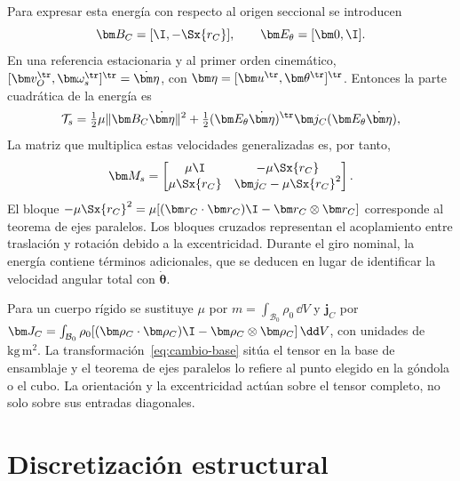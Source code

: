 

Para expresar esta energía con respecto al origen seccional se introducen
\begin{equation}
\bm B_C=[\I,-\Sx{r_C}],\qquad \bm E_\theta=[\bm0,\I].
\end{equation}
En una referencia estacionaria y al primer orden cinemático,
$[\bm v_O^\tr,\bm\omega_s^\tr]^\tr=\dot{\bm\eta}$,
con $\bm\eta=[\bm u^\tr,\bm\theta^\tr]^\tr$. Entonces la parte cuadrática de la energía es
\begin{equation}
\mathcal T_s=\tfrac12\mu\|\bm B_C\dot{\bm\eta}\|^2
+\tfrac12(\bm E_\theta\dot{\bm\eta})^\tr\bm j_C(\bm E_\theta\dot{\bm\eta}),
\end{equation}
La matriz que multiplica estas velocidades generalizadas es, por tanto,
\begin{equation}
\bm M_s=\begin{bmatrix}
\mu\I&-\mu\Sx{r_C}\\
\mu\Sx{r_C}&\bm j_C-\mu\Sx{r_C}^2
\end{bmatrix}.
\label{eq:Ms}
\end{equation}
El bloque $-\mu\Sx{r_C}^2=\mu[(\bm r_C\cdot\bm r_C)\I-\bm r_C\otimes\bm r_C]$ corresponde al teorema de ejes paralelos. Los bloques cruzados representan el acoplamiento entre traslación y rotación debido a la excentricidad. Durante el giro nominal, la energía contiene términos adicionales, que se deducen en lugar de identificar la velocidad angular total con $\dot{\bm\theta}$.

Para un cuerpo rígido se sustituye $\mu$ por $m=\int_{\mathcal B_0}\rho_0\,\dd V$ y $\bm j_C$ por $\bm J_C=\int_{\mathcal B_0}\rho_0[(\bm\rho_C\cdot\bm\rho_C)\I-\bm\rho_C\otimes\bm\rho_C]\,\dd V$, con unidades de $\mathrm{kg\,m^2}$. La transformación~\eqref{eq:cambio-base} sitúa el tensor en la base de ensamblaje y el teorema de ejes paralelos lo refiere al punto elegido en la góndola o el cubo. La orientación y la excentricidad actúan sobre el tensor completo, no solo sobre sus entradas diagonales.

\section{Discretización estructural}
\label{sec:elementos}
